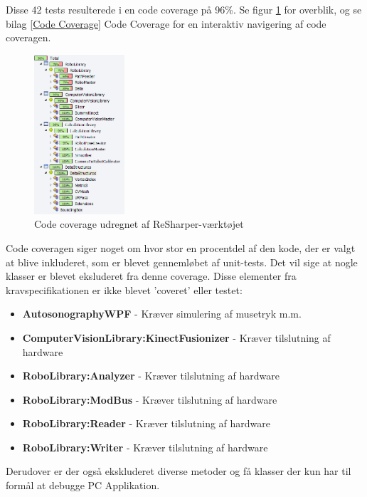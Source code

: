 Disse 42 tests resulterede i en code coverage på 96\%. Se figur \ref{CodeCoverage} for overblik, og se bilag \ref{Code Coverage} Code Coverage for en interaktiv navigering af code coveragen. 

\begin{figure}[H]
    \centering
    \includegraphics[width=0.3\textwidth]{figurer/d/Test/coverage}
    \caption{Code coverage udregnet af ReSharper-værktøjet}
    \label{CodeCoverage}
\end{figure}

Code coveragen siger noget om hvor stor en procentdel af den kode, der er valgt at blive inkluderet, som er blevet gennemløbet af unit-tests. Det vil sige at nogle klasser er blevet eksluderet fra denne coverage. Disse elementer fra kravspecifikationen er ikke blevet 'coveret' eller testet:
\begin{itemize}
\setlength\itemsep{0.25em}
\item{\textbf{AutosonographyWPF}} - Kræver simulering af musetryk m.m.
\item{\textbf{ComputerVisionLibrary:KinectFusionizer}} - Kræver tilslutning af hardware
\item{\textbf{RoboLibrary:Analyzer}} - Kræver tilslutning af hardware
\item{\textbf{RoboLibrary:ModBus}} - Kræver tilslutning af hardware
\item{\textbf{RoboLibrary:Reader}} - Kræver tilslutning af hardware
\item{\textbf{RoboLibrary:Writer}} - Kræver tilslutning af hardware
\end{itemize}

Derudover er der også ekskluderet diverse metoder og få klasser der kun har til formål at debugge PC Applikation.